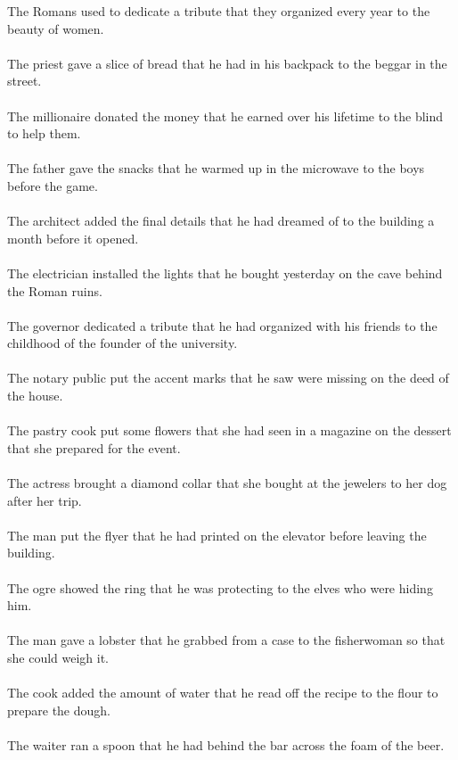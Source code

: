 The Romans used to dedicate a tribute that they organized every year to the beauty of women.	\\	\\
The priest gave a slice of bread that he had in his backpack to the beggar in the street.	\\	\\
The millionaire donated the money that he earned over his lifetime to the blind to help them.	\\	\\
The father gave the snacks that he warmed up in the microwave to the boys before the game.	\\	\\
The architect added the final details that he had dreamed of to the building a month before it opened.	\\	\\
The electrician installed the lights that he bought yesterday on the cave behind the Roman ruins.	\\	\\
The governor dedicated a tribute that he had organized with his friends to the childhood of the founder of the university.	\\	\\
The notary public put the accent marks that he saw were missing on the deed of the house.	\\	\\
The pastry cook put some flowers that she had seen in a magazine on the dessert that she prepared for the event.	\\	\\
The actress brought a diamond collar that she bought at the jewelers to her dog after her trip.	\\	\\
The man put the flyer that he had printed on the elevator before leaving the building.	\\	\\
The ogre showed the ring that he was protecting to the elves who were hiding him.	\\	\\
The man gave a lobster that he grabbed from a case to the fisherwoman so that she could weigh it.	\\	\\
The cook added the amount of water that he read off the recipe to the flour to prepare the dough.	\\	\\
The waiter ran a spoon that he had behind the bar across the foam of the beer.	\\	\\
